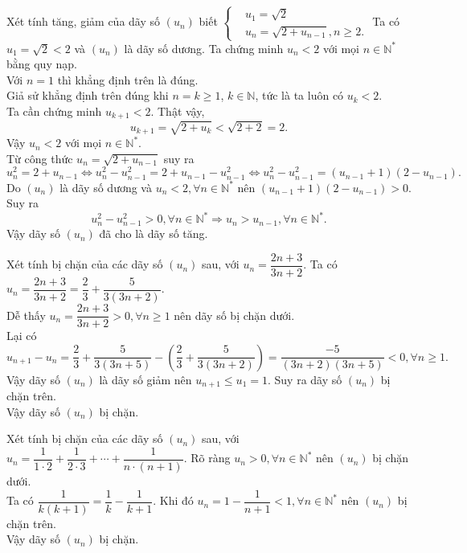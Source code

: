 \begin{bt}%
	Xét tính tăng, giảm của dãy số $(u_n)$ biết $\left\{\begin{aligned}&u_1=\sqrt{2} \\&u_n=\sqrt{2+u_{n-1}}, n\geq 2.\end{aligned}\right.$
	\loigiai
	{
		Ta có $u_1=\sqrt{2}<2$ và $(u_n)$ là dãy số dương. Ta chứng minh $u_n<2$ với mọi $n\in \mathbb{N}^*$ bằng quy nạp.\\
		Với $n=1$ thì khẳng định trên là đúng.\\
		Giả sử khẳng định trên đúng khi $n=k\geq 1$, $k\in \mathbb{N}$, tức là ta luôn có $u_k<2$.\\
		Ta cần chứng minh $u_{k+1}<2$. Thật vậy,
		\[u_{k+1}=\sqrt{2+u_k}<\sqrt{2+2}=2.\]
		Vậy $u_n<2$ với mọi $n\in \mathbb{N}^*$.\\
		Từ công thức $u_n=\sqrt{2+u_{n-1}}$ suy ra
		\[u_n^2=2+u_{n-1} \Leftrightarrow u_n^2-u_{n-1}^2 = 2+u_{n-1}-u_{n-1}^2 \Leftrightarrow u_n^2-u_{n-1}^2 = (u_{n-1}+1)(2-u_{n-1}).\]
		Do $(u_n)$ là dãy số dương và $u_n<2, \forall n\in \mathbb{N}^*$ nên $(u_{n-1}+1)(2-u_{n-1})>0$. Suy ra
		\[u_n^2-u_{n-1}^2>0, \forall n\in \mathbb{N}^* \Rightarrow u_n>u_{n-1}, \forall n\in \mathbb{N}^*.\]
		Vậy dãy số $(u_n)$ đã cho là dãy số tăng.
	}
\end{bt}

\begin{bt}%
	Xét tính bị chặn của các dãy số $(u_n)$ sau, với $u_n=\dfrac{2n+3}{3n+2}$.
	\loigiai
	{
		Ta có $u_n=\dfrac{2n+3}{3n+2}=\dfrac{2}{3}+\dfrac{5}{3(3n+2)}$.\\
		Dễ thấy $u_n=\dfrac{2n+3}{3n+2}>0, \forall n \geq 1$ nên dãy số bị chặn dưới.\\
		Lại có
		\[u_{n+1}-u_n=\dfrac{2}{3}+\dfrac{5}{3(3n+5)}-\left( \dfrac{2}{3}+\dfrac{5}{3(3n+2)} \right)=\dfrac{-5}{(3n+2)(3n+5)}<0, \forall n \geq 1.\]
		Vậy dãy số $(u_n)$ là dãy số giảm nên $u_{n+1}\leq u_1=1$. Suy ra dãy số $(u_n)$ bị chặn trên.\\
		Vậy dãy số $(u_n)$ bị chặn.
	}
\end{bt}

\begin{bt}%
	Xét tính bị chặn của các dãy số $(u_n)$ sau, với $u_n=\dfrac{1}{1\cdot 2}+\dfrac{1}{2\cdot 3}+\cdots+\dfrac{1}{n\cdot (n+1)}$.
	\loigiai
	{
		Rõ ràng $u_n>0, \forall n \in \mathbb{N}^*$ nên $(u_n)$ bị chặn dưới.\\
		Ta có $\dfrac{1}{k(k+1)}=\dfrac{1}{k}-\dfrac{1}{k+1}$. Khi đó   $u_n=1-\dfrac{1}{n+1}<1, \forall n \in \mathbb{N}^*$ nên $(u_n)$ bị chặn trên.\\ Vậy dãy số $(u_n)$ bị chặn.	
	}
\end{bt}

